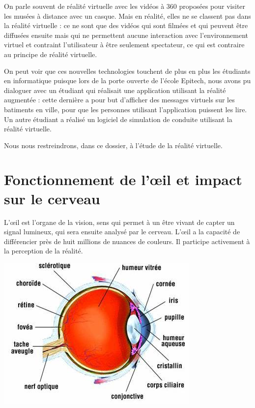 \documentclass[12pt, a4paper]{report}
\begin{document}
On parle souvent de réalité virtuelle avec les vidéos à 360\degres{} proposées pour visiter les musées à distance avec un casque. Mais en réalité, elles ne se classent pas dans la réalité virtuelle : ce ne sont que des vidéos qui sont filmées et qui peuvent être diffusées ensuite mais qui ne permettent aucune interaction avec l'environnement virtuel et contraint l'utilisateur à être seulement spectateur, ce qui est contraire au principe de réalité virtuelle.

On peut voir que ces nouvelles technologies touchent de plus en plus les étudiants en informatique puisque lors de la porte ouverte de l'école Epitech, nous avons pu dialoguer avec un étudiant qui réalisait une application utilisant la réalité augmentée : cette dernière a pour but d'afficher des messages virtuels sur les batiments en ville, pour que les personnes utilisant l'application puissent les lire. Un autre étudiant a réalisé un logiciel de simulation de conduite utilisant la réalité virtuelle.

Nous nous restreindrons, dans ce dossier, à l'étude de la réalité virtuelle.

\chapter[l'\oe il et le cerveau]{Fonctionnement de l'\oe il et impact sur le cerveau}

L'\oe il est l'organe de la vision, sens qui permet à un être vivant de capter un signal lumineux, qui sera ensuite analysé par le cerveau.
L'\oe il a la capacité  de différencier près de huit millions de nuances de couleurs. Il participe activement à la perception de la réalité.

\begin{center}
\includegraphics[scale=0.5]{oeil.jpg}
\end{center}
\end{document}
